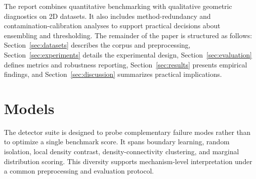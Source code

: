 \documentclass[cameraready]{Interspeech}
\begin{document}
The report combines quantitative benchmarking with qualitative geometric diagnostics on 2D datasets. It also includes method-redundancy and contamination-calibration analyses to support practical decisions about ensembling and thresholding. The remainder of the paper is structured as follows: Section~\ref{sec:datasets} describes the corpus and preprocessing, Section~\ref{sec:experiments} details the experimental design, Section~\ref{sec:evaluation} defines metrics and robustness reporting, Section~\ref{sec:results} presents empirical findings, and Section~\ref{sec:discussion} summarizes practical implications.

\section{Models}

The detector suite is designed to probe complementary failure modes rather than to optimize a single benchmark score. It spans boundary learning, random isolation, local density contrast, density-connectivity clustering, and marginal distribution scoring. This diversity supports mechanism-level interpretation under a common preprocessing and evaluation protocol.
\end{document}
